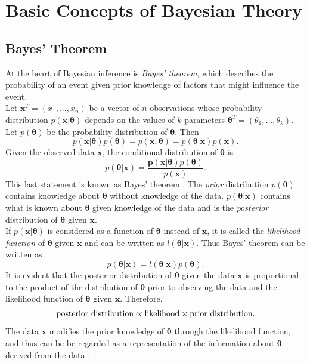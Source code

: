 \section{Basic Concepts of Bayesian Theory}
\subsection{Bayes' Theorem}
At the heart of Bayesian inference is \textit{Bayes' theorem}, which describes the probability of an event given prior knowledge of factors that might influence the event. \\
Let $\pmb{x}^T=\left(x_1,...,x_n\right)$ be a vector of $n$ observations whose probability distribution $p\left(\pmb{x}|\pmb{\theta}\right)$ depends on the values of $k$ parameters $\pmb{\theta}^T=\left(\theta_1,...,\theta_k\right)$. Let $p\left(\pmb{\theta}\right)$ be the probability distribution of $\pmb{\pmb{\theta}}$. Then 
\begin{equation}
    p\left(\pmb{x}|\pmb{\theta}\right)p\left(\pmb{\theta}\right)=p\left(\pmb{x},\pmb{\theta}\right) = p\left(\pmb{\theta}|\pmb{x}\right)p\left(\pmb{x}\right).
\end{equation}
Given the observed data $\pmb{x}$, the conditional distribution of $\pmb{\theta}$ is
\begin{equation}
    p\left(\pmb{\theta}|\pmb{x}\right)=\frac{\pmb{p}\left(\pmb{x}|\pmb{\theta}\right)p\left(\pmb{\theta}\right)}{p\left(\pmb{x}\right)}.
\end{equation}
This last statement is known as Bayes' theorem \autocite[][]{bayes1763lii}. The \textit{prior} distribution $p\left(\pmb{\theta}\right)$ contains knowledge about $\pmb{\theta}$ without knowledge of the data. $p\left(\pmb{\theta}|\pmb{x}\right)$ contains what is known about $\pmb{\theta}$ given knowledge of the data and is the \textit{posterior} distribution of $\pmb{\theta}$ given $\pmb{x}$. \\
If $p\left(\pmb{x}|\pmb{\theta}\right)$ is considered as a function of $\pmb{\theta}$ instead of $\pmb{x}$, it is called the \textit{likelihood function} of $\pmb{\theta}$ given $\pmb{x}$ and can be written as $l\left(\pmb{\theta}|\pmb{x}\right)$. Thus Bayes' theorem can be written as
\begin{equation}
    p\left(\pmb{\theta}|\pmb{x}\right)=l\left(\pmb{\theta}|\pmb{x}\right)p\left(\pmb{\theta}\right).
\end{equation}
It is evident that the posterior distribution of $\pmb{\theta}$ given the data $\pmb{x}$ is proportional to the product of the distribution of $\pmb{\theta}$ prior to observing the data and the likelihood function of $\pmb{\theta}$ given $\pmb{x}$. Therefore,
\begin{equation*}
    \hbox{posterior distribution} \propto  \hbox{likelihood}\times\hbox{prior distribution}.
\end{equation*}
The data $\pmb{x}$ modifies the prior knowledge of $\pmb{\theta}$ through the likelihood function, and thus can be be regarded as a representation of the information about  $\pmb{\theta}$ derived from the data \autocite[][]{box2011bayesian}.
